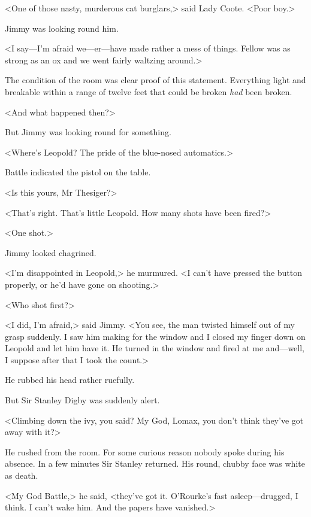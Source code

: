 <One of those nasty, murderous cat burglars,> said Lady Coote. <Poor boy.>

Jimmy was looking round him.

<I say—I'm afraid we—er—have made rather a mess of things. Fellow was as strong as an ox and we went fairly waltzing around.>

The condition of the room was clear proof of this statement. Everything light and breakable within a range of twelve feet that could be broken \emph{had} been broken.

<And what happened then?>

But Jimmy was looking round for something.

<Where's Leopold? The pride of the blue-nosed automatics.>

Battle indicated the pistol on the table.

<Is this yours, Mr Thesiger?>

<That's right. That's little Leopold. How many shots have been fired?>

<One shot.>

Jimmy looked chagrined.

<I'm disappointed in Leopold,> he murmured. <I can't have pressed the button properly, or he'd have gone on shooting.>

<Who shot first?>

<I did, I'm afraid,> said Jimmy. <You see, the man twisted himself out of my grasp suddenly. I saw him making for the window and I closed my finger down on Leopold and let him have it. He turned in the window and fired at me and—well, I suppose after that I took the count.>

He rubbed his head rather ruefully.

But Sir Stanley Digby was suddenly alert.

<Climbing down the ivy, you said? My God, Lomax, you don't think they've got away with it?>

He rushed from the room. For some curious reason nobody spoke during his absence. In a few minutes Sir Stanley returned. His round, chubby face was white as death.

<My God Battle,> he said, <they've got it. O'Rourke's fast asleep—drugged, I think. I can't wake him. And the papers have vanished.>